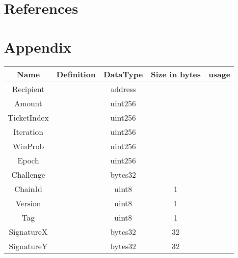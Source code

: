 \section{References}

\section{Appendix}
\vspace{1cm}
    \begin{tabular}{ c | c | c | c | c}
    Name & Definition & DataType & Size in bytes & usage\\ \hline
    Recipient & &address &  & \\  
    Amount & &uint256 & &  \\
    TicketIndex & &uint256 &  & \\
    Iteration & &uint256 &  & \\
    WinProb & &uint256 &  & \\
    Epoch & &uint256 &  & \\
    Challenge & &bytes32 &  & \\
    ChainId & &uint8 & 1 & \\
    Version & &uint8 & 1 & \\
    Tag & &uint8 & 1 & \\
    SignatureX & &bytes32 & 32 & \\
    SignatureY & &bytes32 & 32 & 
    \end{tabular}


